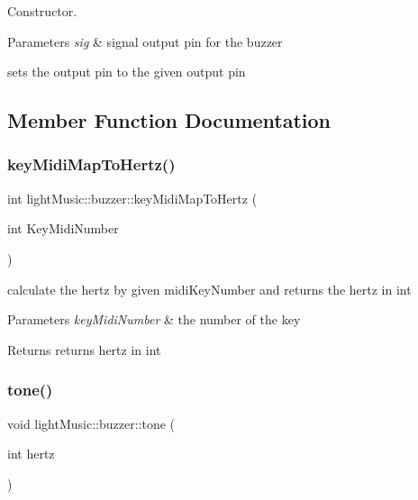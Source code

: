 Constructor. 


\begin{DoxyParams}{Parameters}
{\em sig} & signal output pin for the buzzer\\
\hline
\end{DoxyParams}
sets the output pin to the given output pin 

\subsection{Member Function Documentation}
\mbox{\label{classlight_music_1_1buzzer_a51b71d6a57ac66340e67f641fb3d3a69}} 
\subsubsection{\texorpdfstring{key\+Midi\+Map\+To\+Hertz()}{keyMidiMapToHertz()}}
{\footnotesize\ttfamily int light\+Music\+::buzzer\+::key\+Midi\+Map\+To\+Hertz (\begin{DoxyParamCaption}\item[{int}]{Key\+Midi\+Number }\end{DoxyParamCaption})}



calculate the hertz by given midi\+Key\+Number and returns the hertz in int 


\begin{DoxyParams}{Parameters}
{\em key\+Midi\+Number} & the number of the key \\
\hline
\end{DoxyParams}
\begin{DoxyReturn}{Returns}
returns hertz in int 
\end{DoxyReturn}
\mbox{\label{classlight_music_1_1buzzer_a5fed541127d6e863a4981b79388ab1bb}} 
\subsubsection{\texorpdfstring{tone()}{tone()}}
{\footnotesize\ttfamily void light\+Music\+::buzzer\+::tone (\begin{DoxyParamCaption}\item[{int}]{hertz }\end{DoxyParamCaption})}



